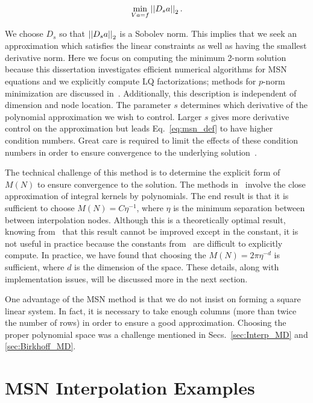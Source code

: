 \begin{equation}
    \min_{Va=f} \left| \left| D_{s}a \right| \right|_{2}.
    \label{eq:msn_def}
\end{equation}

\noindent
We choose $D_{s}$ so that $\left| \left| D_{s}a \right| \right|_{2}$ is a Sobolev norm.
This implies that we seek an approximation which satisfies the linear
constraints as well as having the smallest derivative norm.
Here we focus on computing the minimum 2-norm solution
because this dissertation investigates efficient numerical algorithms
for MSN equations and we explicitly compute LQ factorizations;
methods for $p$-norm minimization are discussed in~\cite{msnInterp,msnBirkhoff}.
Additionally, this description is independent of dimension and node location.
The parameter $s$ determines which derivative of the
polynomial approximation we wish to control.
Larger $s$ gives more derivative control on the approximation
but leads Eq.~\eqref{eq:msn_def} to have higher condition
numbers. Great care is required to limit the effects of these
condition numbers in order to ensure convergence to the underlying
solution~\cite{msnBirkhoff}.

The technical challenge of this method is to determine
the explicit form of $M(N)$ to ensure convergence to the solution.
The methods in~\cite{msnInterp,msnBirkhoff} involve the close
approximation of integral kernels by polynomials.
The end result is that it is sufficient to choose $M(N) = C\eta^{-1}$,
where $\eta$ is the minimum separation between between
interpolation nodes. Although this is a theoretically optimal result,
knowing from~\cite{interpFunctionsBook} that this result cannot
be improved except in the constant, it is not useful in practice
because the constants from~\cite{msnInterp,msnBirkhoff}
are difficult to explicitly compute.
In practice, we have found that choosing the $M(N) = 2\pi\eta^{-d}$
is sufficient, where $d$ is the dimension of the space.
These details, along with
implementation issues, will be discussed more in the next section.

One advantage of the MSN method is that we do not insist on forming
a square linear system.
In fact, it is necessary
to take enough columns (more than twice the number of rows)
in order to ensure a good approximation. Choosing the proper
polynomial space was a challenge mentioned in Secs.~\ref{sec:Interp_MD}
and \ref{sec:Birkhoff_MD}.



\section{MSN Interpolation Examples}
\label{sec:MSN_slow_examples}

